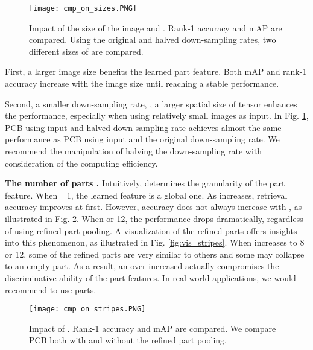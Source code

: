 \documentclass[10pt,twocolumn,letterpaper]{article}
\begin{document}
{{{\begin{figure}[t]
\begin{center}
\texttt{[image: cmp\_on\_sizes.PNG]}
\end{center}

   \caption{Impact of the size of the image and \bm{}. Rank-1 accuracy and mAP are compared. Using the original and halved down-sampling rates, two different sizes of \bm are compared.} 
\label{fig:cmp_sizes}
\end{figure}



First, a larger image size benefits the learned part feature. Both mAP and rank-1 accuracy increase with the image size until reaching a stable performance.

Second, a smaller down-sampling rate, \ie, a larger spatial size of tensor \bm{} enhances the performance, especially when using relatively small images as input. In Fig. \ref{fig:cmp_sizes},  PCB  using  input and halved down-sampling rate achieves almost the same performance as PCB using  input and the original down-sampling rate. We recommend the manipulation of halving the down-sampling rate with consideration of the computing efficiency. 


\textbf{The number of parts .} Intuitively,  determines the granularity of the part feature. When =1, the learned feature is a global one. As  increases, retrieval accuracy improves at first. However, accuracy does not always increase with , as illustrated in Fig. \ref{fig:stripes}. When  or 12, the performance drops dramatically, regardless of using refined part pooling. A visualization of the refined parts offers insights into this phenomenon, as illustrated in Fig. \ref{fig:vis_stripes}. When  increases to 8 or 12, some of the refined parts are very similar to others and some may collapse to an empty part. As a result, an over-increased  actually compromises the discriminative ability of the part features. In real-world applications, we would recommend to use  parts.
\begin{figure}[t]
\setlength{\belowcaptionskip}{-0.4cm}
\begin{center}
\texttt{[image: cmp\_on\_stripes.PNG]}
\end{center}
   \caption{Impact of . Rank-1 accuracy and mAP are compared. We compare PCB both with and without  the refined part pooling.}
\label{fig:stripes}
\end{figure}


\begin{figure}[t]


\end{figure}}}}
\end{document}
